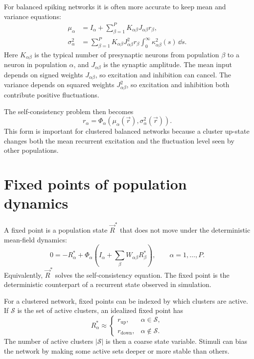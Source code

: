 For balanced spiking networks it is often more accurate to keep mean and variance equations:
%
\begin{align}
  \mu_\alpha
  &=
  I_\alpha
  +
  \sum_{\beta=1}^P K_{\alpha\beta}J_{\alpha\beta} r_\beta,
  \label{eq:mean-input-balanced}
  \\
  \sigma_\alpha^2
  &=
  \sum_{\beta=1}^P
  K_{\alpha\beta}J_{\alpha\beta}^2 r_\beta
  \int_0^\infty \kappa_{\alpha\beta}^2(s)\,\dd s .
  \label{eq:variance-input-balanced}
\end{align}
%
Here $K_{\alpha\beta}$ is the typical number of presynaptic neurons from population $\beta$ to a neuron in population $\alpha$, and $J_{\alpha\beta}$ is the synaptic amplitude. The mean input depends on signed weights $J_{\alpha\beta}$, so excitation and inhibition can cancel. The variance depends on squared weights $J_{\alpha\beta}^2$, so excitation and inhibition both contribute positive fluctuations.

The self-consistency problem then becomes
%
\begin{equation}
  r_\alpha
  =
  \Phi_\alpha(\mu_\alpha(\vec r),\sigma_\alpha^2(\vec r)).
  \label{eq:self-consistency-mean-variance}
\end{equation}
%
This form is important for clustered balanced networks because a cluster up-state changes both the mean recurrent excitation and the fluctuation level seen by other populations.

\section{Fixed points of population dynamics}
\label{sec:fixed-points-population-dynamics}

A fixed point is a population state $\vec R^*$ that does not move under the deterministic mean-field dynamics:
%
\begin{equation}
  0
  =
  -R_\alpha^*
  +
  \Phi_\alpha\!\left(
    I_\alpha
    +
    \sum_\beta W_{\alpha\beta}R_\beta^*
  \right),
  \qquad
  \alpha=1,\ldots,P.
  \label{eq:mf-fixed-point}
\end{equation}
%
Equivalently, $\vec R^*$ solves the self-consistency equation. The fixed point is the deterministic counterpart of a recurrent state observed in simulation.

For a clustered network, fixed points can be indexed by which clusters are active. If $\mathcal{S}$ is the set of active clusters, an idealized fixed point has
%
\begin{equation}
  R_\alpha^*
  \approx
  \begin{cases}
    r_{\mathrm{up}}, & \alpha\in\mathcal{S},\\
    r_{\mathrm{down}}, & \alpha\notin\mathcal{S}.
  \end{cases}
  \label{eq:cluster-fixed-point-pattern}
\end{equation}
%
The number of active clusters $|\mathcal{S}|$ is then a coarse state variable. Stimuli can bias the network by making some active sets deeper or more stable than others.

